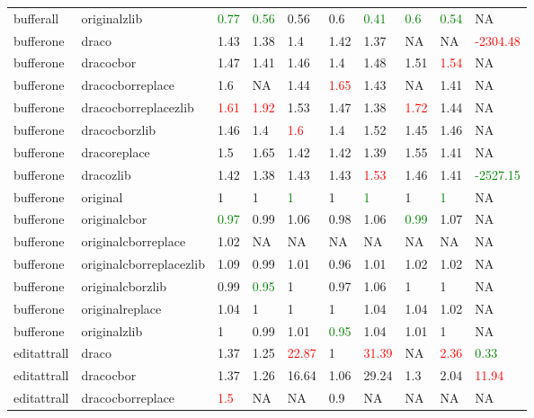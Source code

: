 \begin{landscape}
\begin{longtable}{llllllllll}
bufferall & originalzlib & \textcolor{green}{0.77} & \textcolor{green}{0.56} & 0.56 & 0.6 & \textcolor{green}{0.41} & \textcolor{green}{0.6} & \textcolor{green}{0.54} & NA\\
bufferone & draco & 1.43 & 1.38 & 1.4 & 1.42 & 1.37 & NA & NA & \textcolor{red}{-2304.48}\\
bufferone & dracocbor & 1.47 & 1.41 & 1.46 & 1.4 & 1.48 & 1.51 & \textcolor{red}{1.54} & NA\\
bufferone & dracocborreplace & 1.6 & NA & 1.44 & \textcolor{red}{1.65} & 1.43 & NA & 1.41 & NA\\
bufferone & dracocborreplacezlib & \textcolor{red}{1.61} & \textcolor{red}{1.92} & 1.53 & 1.47 & 1.38 & \textcolor{red}{1.72} & 1.44 & NA\\
bufferone & dracocborzlib & 1.46 & 1.4 & \textcolor{red}{1.6} & 1.4 & 1.52 & 1.45 & 1.46 & NA\\
bufferone & dracoreplace & 1.5 & 1.65 & 1.42 & 1.42 & 1.39 & 1.55 & 1.41 & NA\\
bufferone & dracozlib & 1.42 & 1.38 & 1.43 & 1.43 & \textcolor{red}{1.53} & 1.46 & 1.41 & \textcolor{green}{-2527.15}\\
bufferone & original & 1 & 1 & \textcolor{green}{1} & 1 & \textcolor{green}{1} & 1 & \textcolor{green}{1} & NA\\
bufferone & originalcbor & \textcolor{green}{0.97} & 0.99 & 1.06 & 0.98 & 1.06 & \textcolor{green}{0.99} & 1.07 & NA\\
bufferone & originalcborreplace & 1.02 & NA & NA & NA & NA & NA & NA & NA\\
bufferone & originalcborreplacezlib & 1.09 & 0.99 & 1.01 & 0.96 & 1.01 & 1.02 & 1.02 & NA\\
bufferone & originalcborzlib & 0.99 & \textcolor{green}{0.95} & 1 & 0.97 & 1.06 & 1 & 1 & NA\\
\rowcolor{lightgray}  bufferone & originalreplace & 1.04 & 1 & 1 & 1 & 1.04 & 1.04 & 1.02 & NA\\
\rowcolor{lightgray}  bufferone & originalzlib & 1 & 0.99 & 1.01 & \textcolor{green}{0.95} & 1.04 & 1.01 & 1 & NA\\
\rowcolor{lightgray}  editattrall & draco & 1.37 & 1.25 & \textcolor{red}{22.87} & 1 & \textcolor{red}{31.39} & NA & \textcolor{red}{2.36} & \textcolor{green}{0.33}\\
\rowcolor{lightgray}  editattrall & dracocbor & 1.37 & 1.26 & 16.64 & 1.06 & 29.24 & 1.3 & 2.04 & \textcolor{red}{11.94}\\
\rowcolor{lightgray}  editattrall & dracocborreplace & \textcolor{red}{1.5} & NA & NA & 0.9 & NA & NA & NA & NA\\

\end{longtable}
\end{landscape}
